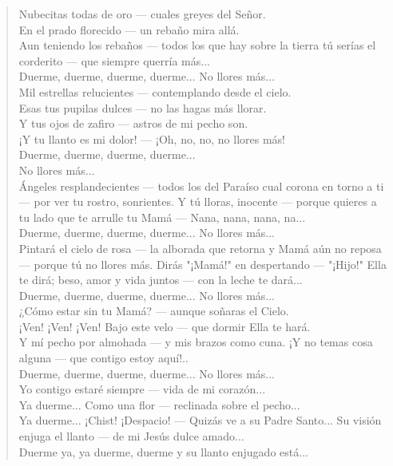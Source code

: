 \documentclass[12pt]{book} %
\begin{document}
\begin{verse}
Nubecitas todas de oro — cuales greyes del Señor.\\
En el prado florecido — un rebaño mira allá. \\
Aun teniendo los rebaños — todos los que hay sobre la tierra tú serías el corderito — que siempre querría más... \\
Duerme, duerme, duerme, duerme... No llores más... \\
Mil estrellas relucientes — contemplando desde el cielo. \\
Esas tus pupilas dulces — no las hagas más llorar. \\
Y tus ojos de zafiro — astros de mi pecho son. \\
¡Y tu llanto es mi dolor! — ¡Oh, no, no, no llores más!\\
Duerme, duerme, duerme, duerme... \\
No llores más... \\
Ángeles resplandecientes — todos los del Paraíso cual corona en torno a ti — por ver tu rostro, sonrientes. Y tú lloras, inocente — porque quieres a tu lado que te arrulle tu Mamá — Nana, nana, nana, na... \\
Duerme, duerme, duerme, duerme... No llores más... \\
Pintará el cielo de rosa — la alborada que retorna y Mamá aún no reposa — porque tú no llores más. Dirás "¡Mamá!" en despertando — "¡Hijo!" Ella te dirá; beso, amor y vida juntos — con la leche te dará... \\
Duerme, duerme, duerme, duerme... No llores más... \\
¿Cómo estar sin tu Mamá? — aunque soñaras el Cielo.\\ 
¡Ven! ¡Ven! ¡Ven! Bajo este velo — que dormir Ella te hará. \\
Y mí pecho por almohada — y mis brazos como cuna. ¡Y no temas cosa alguna — que contigo estoy aquí!.. \\
Duerme, duerme, duerme, duerme... No llores más... \\
Yo contigo estaré siempre — vida de mi corazón... \\
Ya duerme... Como una flor — reclinada sobre el pecho... \\
Ya duerme... ¡Chist! ¡Despacio! — Quizás ve a su Padre Santo... Su visión enjuga el llanto — de mi Jesús dulce amado... \\
Duerme ya, ya duerme, duerme y su llanto enjugado está...
\end{verse} 
\end{document}
